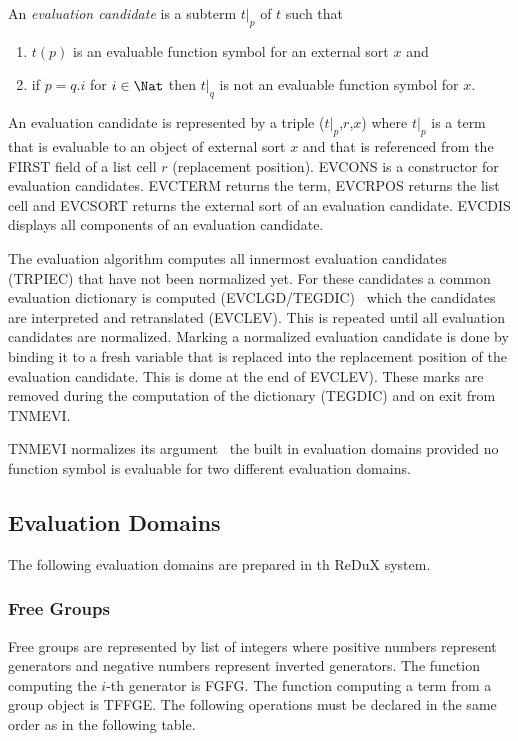 An \emph{evaluation candidate}
is a subterm $t|_p$ of $t$ such that
\begin{enumerate}
\item $t(p)$ is an evaluable function symbol for an external sort $x$ and
\item if $p = q.i$ for \( i \in \Nat \) then $t|_q$ is not  an 
      evaluable function symbol for $x$.
\end{enumerate}
An evaluation candidate is represented by a triple ($t|_p$,$r$,$x$) 
where $t|_p$ is a term that
is evaluable to an object of external sort $x$ and that is referenced from
the FIRST field of a list cell $r$ (replacement position).
EVCONS is a constructor for evaluation candidates.
EVCTERM returns the term, EVCRPOS returns the list cell and 
EVCSORT returns the external sort of an evaluation candidate.
EVCDIS displays all components of an evaluation candidate.

The evaluation algorithm computes all innermost evaluation candidates
(TRPIEC) that have not been normalized yet.
For these candidates a common evaluation dictionary  is computed
(EVCLGD/TEGDIC) \wrt\ which the candidates are interpreted and
retranslated (EVCLEV).
This is repeated until all evaluation candidates are normalized.
Marking a normalized evaluation candidate is done by binding it to a 
fresh variable that is replaced into the replacement position of the 
evaluation candidate.
This is dome at the end of EVCLEV).
These marks are removed during the computation of the dictionary (TEGDIC)
and on exit from TNMEVI.

TNMEVI normalizes its argument \wrt\ the built in evaluation domains provided
no function symbol is evaluable for two different evaluation domains.

\subsection{Evaluation Domains}

The following evaluation domains are prepared in th ReDuX system.

\subsubsection{Free Groups}

Free groups are represented by list of integers where positive numbers
represent generators and negative numbers represent inverted generators.
The function computing the $i$-th generator is FGFG. 
The function computing a term from a group object is TFFGE.
The following operations must be declared in the same order as in the
following table.

